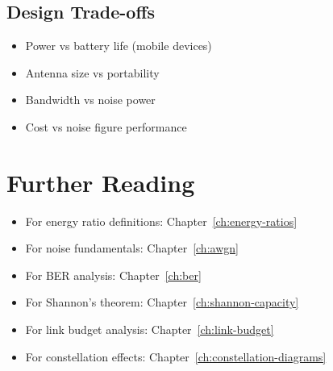 \subsection*{Design Trade-offs}

\begin{itemize}
\item Power vs battery life (mobile devices)
\item Antenna size vs portability
\item Bandwidth vs noise power
\item Cost vs noise figure performance
\end{itemize}

\section{Further Reading}

\begin{itemize}
\item For energy ratio definitions: Chapter~\ref{ch:energy-ratios}
\item For noise fundamentals: Chapter~\ref{ch:awgn}
\item For BER analysis: Chapter~\ref{ch:ber}
\item For Shannon's theorem: Chapter~\ref{ch:shannon-capacity}
\item For link budget analysis: Chapter~\ref{ch:link-budget}
\item For constellation effects: Chapter~\ref{ch:constellation-diagrams}
\end{itemize}
